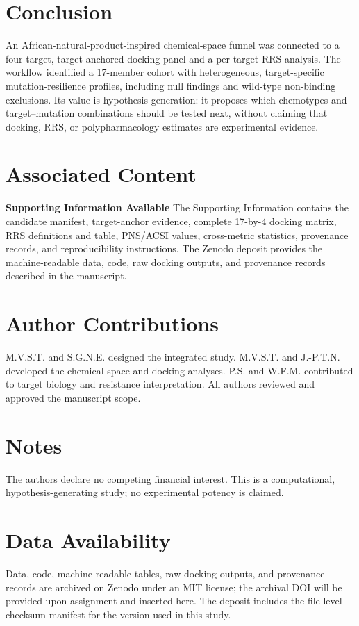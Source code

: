 \documentclass[journal=jcisd8,manuscript=article]{achemso}
\begin{document}
\section{Conclusion}\label{sec:conclusion}
An African-natural-product-inspired chemical-space funnel was connected to a four-target, target-anchored docking panel and a per-target RRS analysis. The workflow identified a 17-member cohort with heterogeneous, target-specific mutation-resilience profiles, including null findings and wild-type non-binding exclusions. Its value is hypothesis generation: it proposes which chemotypes and target--mutation combinations should be tested next, without claiming that docking, RRS, or polypharmacology estimates are experimental evidence.

\section*{Associated Content}
\textbf{Supporting Information Available}
The Supporting Information contains the candidate manifest, target-anchor evidence, complete 17-by-4 docking matrix, RRS definitions and table, PNS/ACSI values, cross-metric statistics, provenance records, and reproducibility instructions. The Zenodo deposit provides the machine-readable data, code, raw docking outputs, and provenance records described in the manuscript.

\section*{Author Contributions}
M.V.S.T. and S.G.N.E. designed the integrated study. M.V.S.T. and J.-P.T.N. developed the chemical-space and docking analyses. P.S. and W.F.M. contributed to target biology and resistance interpretation. All authors reviewed and approved the manuscript scope.

\section*{Notes}
The authors declare no competing financial interest. This is a computational, hypothesis-generating study; no experimental potency is claimed.

\section*{Data Availability}
Data, code, machine-readable tables, raw docking outputs, and provenance records are archived on Zenodo under an MIT license; the archival DOI will be provided upon assignment and inserted here. The deposit includes the file-level checksum manifest for the version used in this study.
\end{document}
